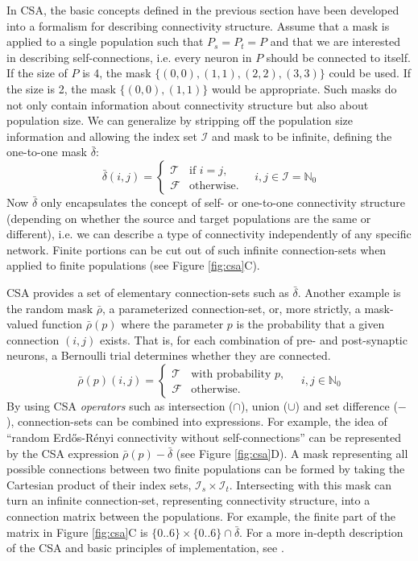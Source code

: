 \documentclass{frontiersSCNS} %
\begin{document}
In CSA, the basic concepts defined in the previous section have been
developed into a formalism for describing connectivity structure.
Assume that a mask is applied to a single population such that $P_s =
P_t = P$ and that we are interested in describing self-connections,
i.e. every neuron in $P$ should be connected to itself.  If the size
of $P$ is 4, the mask $\{(0, 0), (1, 1), (2, 2), (3, 3)\}$ could be
used.  If the size is 2, the mask $\{(0, 0), (1, 1)\}$ would be
appropriate. Such masks do not only contain information about
connectivity structure but also about population size. We can
generalize by stripping off the population size information and
allowing the index set $\mathcal{I}$ and mask to be infinite, defining
the one-to-one mask $\bar{\delta}$:
\begin{equation}
  \bar{\delta}(i, j) =
      \begin{cases}
        \mathcal{T}& \text{if $i = j$},\\
        \mathcal{F}& \text{otherwise}.
      \end{cases}
      \quad i, j \in \mathcal{I} = \mathbb{N}_0
\end{equation}
Now $\bar{\delta}$ only encapsulates the concept of self- or
one-to-one connectivity structure (depending on whether the source and
target populations are the same or different), i.e. we can describe a
type of connectivity independently of any specific network.  Finite
portions can be cut out of such infinite connection-sets when applied
to finite populations (see Figure \ref{fig:csa}C).

CSA provides a set of elementary connection-sets such as
$\bar{\delta}$. Another example is the random mask $\bar{\rho}$, a
parameterized connection-set, or, more strictly, a mask-valued
function $\bar{\rho}(p)$ where the parameter $p$ is the probability
that a given connection $(i, j)$ exists.  That is, for each
combination of pre- and post-synaptic neurons, a Bernoulli trial
determines whether they are connected.
\begin{equation}
  \bar{\rho} (p) (i, j) =
  \begin{cases}
    \mathcal{T}& \text{with probability $p$},\\
    \mathcal{F}& \text{otherwise}.
  \end{cases}
  \quad i, j \in \mathbb{N}_0
\end{equation}
By using CSA \emph{operators} such as intersection ($\cap$), union
($\cup$) and set difference ($-$), connection-sets can be combined into
expressions. For example, the idea of ``random Erd\H{o}s-R\'enyi
connectivity without self-connections'' can be represented by the CSA
expression $\bar{\rho}(p) - \bar{\delta}$ (see Figure
\ref{fig:csa}D). A mask representing all possible connections between
two finite populations can be formed by taking the Cartesian product
of their index sets, $\mathcal{I}_s \times
\mathcal{I}_t$. Intersecting with this mask can turn an infinite
connection-set, representing connectivity structure, into a connection
matrix between the populations. For example, the finite part of the
matrix in Figure \ref{fig:csa}C is $\{0..6\} \times \{0..6\} \cap
\bar{\delta}$. For a more in-depth description of the CSA and basic
principles of implementation, see \citet{djurfeldt12}.
\end{document}
